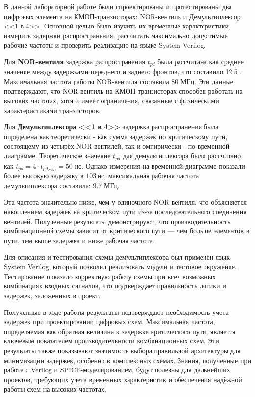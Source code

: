 В данной лабораторной работе были спроектированы и протестированы два цифровых элемента на КМОП-транзисторах: NOR-вентиль и Демультиплексор <<1 в 4>>. Основной целью было изучить их временные характеристики, измерить задержки распространения, рассчитать максимально допустимые рабочие частоты и проверить реализацию на языке System Verilog.

Для \textbf{NOR-вентиля} задержка распространения \( t_{pd} \) была рассчитана как среднее значение между задержками переднего и заднего фронтов, что составило 12.5 .
Максимальная частота работы NOR-вентиля составила \( 80 \text{ МГц}. \)
Эти данные подтверждают, что NOR-вентиль на КМОП-транзисторах способен работать на высоких частотах, хотя и имеет ограничения, связанные с физическими характеристиками транзисторов.

Для \textbf{Демультиплексора <<1 в 4>>} задержка распространения была определена как теоретически - как сумма задержек по критическому пути, состоящему из четырёх NOR-вентилей, так и эмпирически - по временной диаграмме. Теоретическое значение \( t_{pd} \) для демультиплексора было рассчитано как \( t_{pd} = 4 \cdot t_{pd_{NOR}} = 50 \text{ нс} \). Однако измерения на временной диаграмме показали более высокую задержку в \(103 \, \text{нс}\), максимальная рабочая частота демультиплексора составила: \(9.7 \text{ МГц}.\)

Эта частота значительно ниже, чем у одиночного NOR-вентиля, что объясняется накоплением задержек на критическом пути из-за последовательного соединения вентилей. Полученные результаты демонстрируют, что производительность комбинационной схемы зависит от критического пути — чем больше элементов в пути, тем выше задержка и ниже рабочая частота.

Для описания и тестирования схемы демультиплексора был применён язык System Verilog, который позволил реализовать модули и тестовое окружение. Тестирование показало корректную работу схемы при всех возможных комбинациях входных сигналов, что подтверждает правильность логики и задержек, заложенных в проект.

Полученные в ходе работы результаты подтверждают необходимость учета задержек при проектировании цифровых схем. Максимальная частота, определяемая как обратная величина к задержке критического пути, является ключевым показателем производительности комбинационных схем. Эти результаты также показывают значимость выбора правильной архитектуры для минимизации задержек, особенно в комплексных схемах. Знания, полученные при работе с Verilog и SPICE-моделированием, будут полезны для дальнейших проектов, требующих учета временных характеристик и обеспечения надёжной работы схем на высоких частотах.
